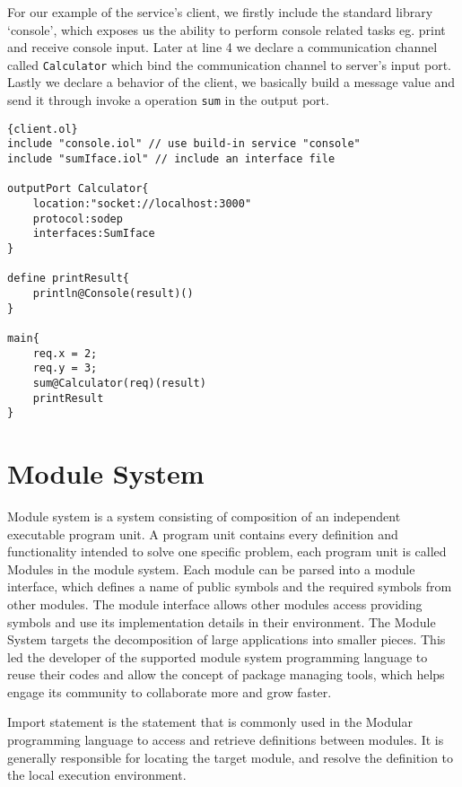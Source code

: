 For our example of the service's client, we firstly include the standard library `console', which exposes us the ability to perform console related tasks eg. print and receive console input. Later at line 4 we declare a communication channel called \texttt{Calculator} which bind the communication channel to server's input port. Lastly we declare a behavior of the client, we basically build a message value and send it through invoke a operation \texttt{sum} in the output port.  

\begin{listing}
    \lstset{language=Jolie,
        style=codeStyle,
        numbers=left,
        firstnumber=1
    }
    \begin{lstlisting}[frame=tlrb]{client.ol}
include "console.iol" // use build-in service "console"
include "sumIface.iol" // include an interface file 

outputPort Calculator{
    location:"socket://localhost:3000"
    protocol:sodep 
    interfaces:SumIface
}

define printResult{
    println@Console(result)()
}

main{
    req.x = 2;
    req.y = 3;
    sum@Calculator(req)(result)
    printResult
}
\end{lstlisting}
    \caption{Sum client example}
    \label{list:example-client}
\end{listing}

\section{Module System}

Module system is a system consisting of composition of an independent executable program unit. A program unit contains every definition and functionality intended to solve one specific problem, each program unit is called Modules in the module system. Each module can be parsed into a module interface, which defines a name of public symbols and the required symbols from other modules. The module interface allows other modules access providing symbols and use its implementation details in their environment. The Module System targets the decomposition of large applications into smaller pieces. This led the developer of the supported module system programming language to reuse their codes and allow the concept of package managing tools, which helps engage its community to collaborate more and grow faster.

Import statement is the statement that is commonly used in the Modular programming language to access and retrieve definitions between modules. It is generally responsible for locating the target module, and resolve the definition to the local execution environment.

